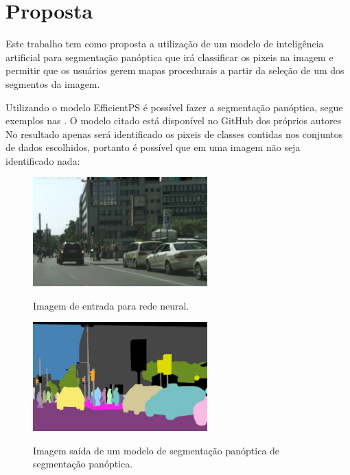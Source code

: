 \section{Proposta}

Este trabalho tem como proposta a utilização de um modelo de inteligência artificial para segmentação panóptica que irá classificar os pixeis na imagem e permitir que os usuários gerem mapas procedurais a partir da seleção de um dos segmentos da imagem.

Utilizando o modelo EfficientPS é possível fazer a segmentação panóptica, segue exemplos nas . O modelo citado está disponível no GitHub dos próprios autores 
 No resultado apenas será identificado os pixeis de classes contidas nos conjuntos de dados escolhidos, portanto é possível que em uma imagem não seja identificado nada:

\begin{figure}[!ht]
	\centering
    \caption{Imagem de entrada para rede neural.}
	\includegraphics[width=0.6\textwidth]{figures/segmantations_1.png}
	\label{fig:segmantations_1}
\end{figure}

\begin{figure}[!ht]
	\centering
    \caption{Imagem saída de um modelo de segmentação panóptica de segmentação panóptica.}
	\includegraphics[width=0.6\textwidth]{figures/segmantations_2.png}
	\label{fig:segmantations_2}
\end{figure}

